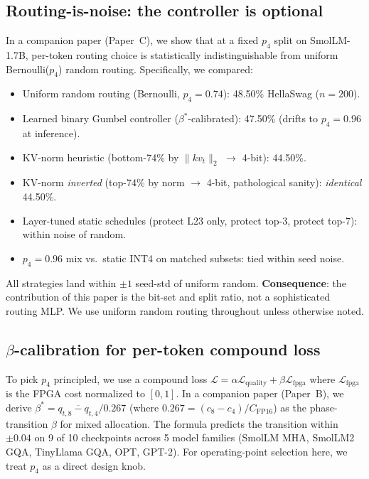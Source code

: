 \documentclass{article}
\begin{document}
\subsection{Routing-is-noise: the controller is optional}
\label{sec:routing_summary}
In a companion paper (Paper~C), we show that at a fixed $p_4$ split on SmolLM-1.7B, per-token routing choice is statistically indistinguishable from uniform Bernoulli($p_4$) random routing. Specifically, we compared:
\begin{itemize}
\item Uniform random routing (Bernoulli, $p_4{=}0.74$): 48.50\% HellaSwag ($n{=}200$).
\item Learned binary Gumbel controller ($\beta^*$-calibrated): 47.50\% (drifts to $p_4{=}0.96$ at inference).
\item KV-norm heuristic (bottom-74\% by $\|kv_t\|_2$ $\to$ 4-bit): 44.50\%.
\item KV-norm \emph{inverted} (top-74\% by norm $\to$ 4-bit, pathological sanity): \emph{identical} 44.50\%.
\item Layer-tuned static schedules (protect L23 only, protect top-3, protect top-7): within noise of random.
\item $p_4{=}0.96$ mix vs.\ static INT4 on matched subsets: tied within seed noise.
\end{itemize}
All strategies land within $\pm 1$ seed-std of uniform random. \textbf{Consequence}: the contribution of this paper is the bit-set and split ratio, not a sophisticated routing MLP. We use uniform random routing throughout unless otherwise noted.

\subsection{$\beta$-calibration for per-token compound loss}
\label{sec:beta_summary}
To pick $p_4$ principled, we use a compound loss $\mathcal{L} = \alpha \mathcal{L}_\text{quality} + \beta \mathcal{L}_\text{fpga}$ where $\mathcal{L}_\text{fpga}$ is the FPGA cost normalized to $[0,1]$. In a companion paper (Paper~B), we derive $\beta^* = \overline{q_{t,8}-q_{t,4}}/0.267$ (where $0.267 = (c_8-c_4)/C_\text{FP16}$) as the phase-transition $\beta$ for mixed allocation. The formula predicts the transition within $\pm 0.04$ on 9 of 10 checkpoints across 5 model families (SmolLM MHA, SmolLM2 GQA, TinyLlama GQA, OPT, GPT-2). For operating-point selection here, we treat $p_4$ as a direct design knob.

\end{document}

